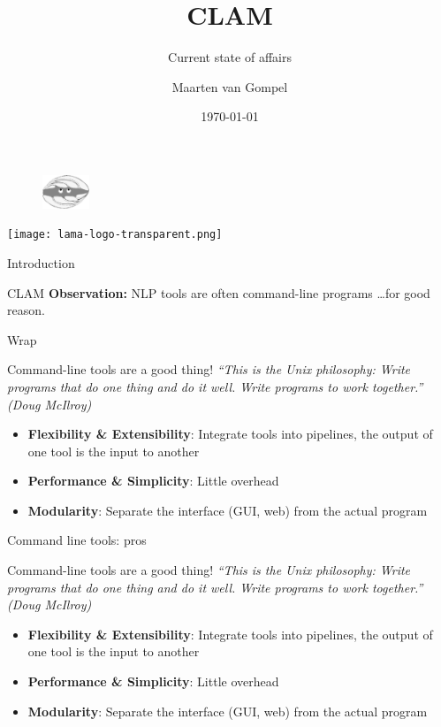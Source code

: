 \documentclass[xcolor=table,10pt,t]{beamer}
\title{CLAM}
\subtitle{Current state of affairs}
\date{\today}
\author{Maarten van Gompel}
\begin{document}
\begin{frame}
  \titlepage
        \begin{figure}
          \includegraphics[height=1cm]{clamup_bw.png}
        \end{figure}
        \vspace{3.5cm}
      \texttt{[image: lama-logo-transparent.png]}
\end{frame}



\begin{frame}{Introduction}
  \begin{block}{CLAM}
    \textbf{Observation:} NLP tools are often command-line programs \ldots for
    good reason.
  \end{block}
\end{frame}


\begin{frame}{Wrap}
  \begin{block}{Command-line tools are a good thing!}
      \emph{``This is the Unix philosophy: Write programs that do one thing and do
      it well. Write programs to work together.'' (Doug McIlroy)}

      \begin{itemize}
        \item \textbf{Flexibility \& Extensibility}: Integrate tools into pipelines, the output of one tool is the input to another
        \item \textbf{Performance \& Simplicity}: Little overhead
        \item \textbf{Modularity}: Separate the interface (GUI, web) from the actual program
      \end{itemize}

  \end{block}
\end{frame}

\begin{frame}{Command line tools: pros}
  \begin{block}{Command-line tools are a good thing!}
      \emph{``This is the Unix philosophy: Write programs that do one thing and do
      it well. Write programs to work together.'' (Doug McIlroy)}

      \begin{itemize}
        \item \textbf{Flexibility \& Extensibility}: Integrate tools into pipelines, the output of one tool is the input to another
        \item \textbf{Performance \& Simplicity}: Little overhead
        \item \textbf{Modularity}: Separate the interface (GUI, web) from the actual program
      \end{itemize}

  \end{block}

\end{frame}
\end{document}
